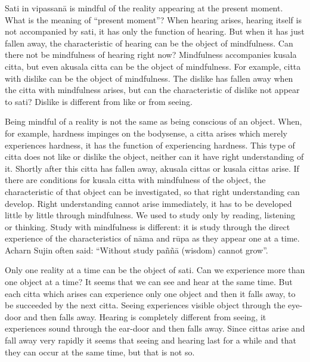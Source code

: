 Sati in vipassanā is mindful of the reality appearing at the present
moment. What is the meaning of ``present moment''? When hearing arises,
hearing itself is not accompanied by sati, it has only the function of
hearing. But when it has just fallen away, the characteristic of hearing
can be the object of mindfulness. Can there not be mindfulness of
hearing right now? Mindfulness accompanies kusala citta, but even
akusala citta can be the object of mindfulness. For example, citta with
dislike can be the object of mindfulness. The dislike has fallen away
when the citta with mindfulness arises, but can the characteristic of
dislike not appear to sati? Dislike is different from like or from
seeing.

Being mindful of a reality is not the same as being conscious of an
object. When, for example, hardness impinges on the bodysense, a citta
arises which merely experiences hardness, it has the function of
experiencing hardness. This type of citta does not like or dislike the
object, neither can it have right understanding of it. Shortly after
this citta has fallen away, akusala cittas or kusala cittas arise. If
there are conditions for kusala citta with mindfulness of the object,
the characteristic of that object can be investigated, so that right
understanding can develop. Right understanding cannot arise immediately,
it has to be developed little by little through mindfulness. We used to
study only by reading, listening or thinking. Study with mindfulness is
different: it is study through the direct experience of the
characteristics of nāma and rūpa as they appear one at a time. Acharn
Sujin often said: ``Without study paññā (wisdom) cannot grow''.

Only one reality at a time can be the object of sati. Can we experience
more than one object at a time? It seems that we can see and hear at the
same time. But each citta which arises can experience only one object
and then it falls away, to be succeeded by the next citta. Seeing
experiences visible object through the eye-door and then falls away.
Hearing is completely different from seeing, it experiences sound
through the ear-door and then falls away. Since cittas arise and fall
away very rapidly it seems that seeing and hearing last for a while and
that they can occur at the same time, but that is not so.

